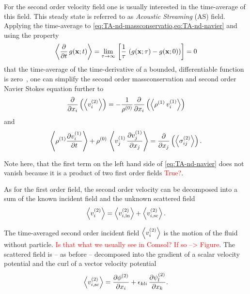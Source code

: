 For the second order velocity field one is usually interested in the 
time-average of this field. This steady state is referred to as \emph{Acoustic 
Streaming} (AS) field. Applying the time-average to 
\cref{eq:TA-nd-massconservatio,eq:TA-nd-navier} and using the property
\begin{equation}
  \left\langle \pdv{t}\,g(\vb{x};t) \right\rangle = \lim\limits_{\tau \rightarrow \infty}{\,
    \left[ \frac{1}{\tau}\,\left( g(\vb{x}; \tau) - g(\vb{x}; 0) \right) 
  \right]} = 0
  \label{eq:TA-avg-property}
\end{equation}
that the time-average of the time-derivative of a bounded, differentiable 
function is zero~\cite{Baasch2020}, one can simplify the second order 
massconservation and second order Navier Stokes equation further to
\begin{equation}
  \pdv{x_{i}}\left( \left\langle v_{i}^{(2)} \right\rangle \right) = 
  -\frac{1}{\rho^{(0)}} \pdv{x_{i}}\left(\left\langle  
  \rho^{(1)}\,v_{i}^{(1)}  \right\rangle\right)
  \label{eq:TA-avg-massconservatio}
\end{equation}
and
\begin{equation}
  \left\langle \rho^{(1)} \pdv{  v_{i}^{(1)}  }{t} \right\rangle + 
  \rho^{(0)}\,\left\langle v_{j}^{(1)}\,\pdv{  v_{j}^{(1)}  }{x_{j}} \right\rangle 
  = \pdv{x_{j}}\left( \left\langle \sigma_{ij}^{(2)} \right\rangle \right).
  \label{eq:TA-avg-navier}
\end{equation}

Note here, that the first term on the left hand side of \cref{eq:TA-nd-navier} 
does not vanish because it is a product of two first order fields 
\textcolor{red}{True?}.

As for the first order field, the second order velocity can be decomposed into 
a sum of the known incident field and the unknown scattered field
\begin{equation}
  \left\langle v_{i}^{(2)} \right\rangle =
    \left\langle v_{i,\mathrm{in}}^{(2)} \right\rangle +
    \left\langle v_{i,\mathrm{sc}}^{(2)} \right\rangle.
  \label{eq:TA-nd-velocity}
\end{equation}

The time-averaged second order incident field $\left\langle v_{i}^{(2)} \right\rangle$ 
is the motion of the fluid without particle. \textcolor{red}{Is that what we 
usually see in Comsol? If so --> Figure}. The scattered field is -- as before 
-- decomposed into the gradient of a scalar velocity potential and the curl of 
a vector velocity potential
\begin{equation}
  \left\langle v_{i,\mathrm{sc}}^{(2)} \right\rangle =
  \pdv{  \phi^{(2)}  }{x_{i}} + 
  \epsilon_{kli}\,\pdv{  \psi^{(2)}  _{l}}{x_{k}}.
  \label{eq:TA-nd-sc-decomposition}
\end{equation}

